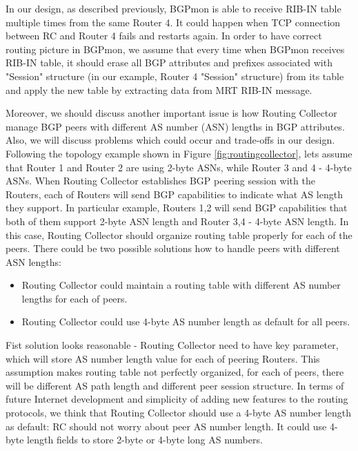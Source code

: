 In our design, as described previously, BGPmon is able to receive RIB-IN table multiple times from the same Router 4. It could happen when TCP connection between RC and Router 4 fails and restarts again.  In order to have correct routing picture in BGPmon, we assume that every time when BGPmon receives RIB-IN table, it should erase all BGP attributes and prefixes associated with "Session" structure (in our example, Router 4 "Session" structure) from its table and apply the new table by extracting data from MRT RIB-IN message. 

Moreover, we should discuss another important issue is how Routing Collector manage BGP peers with different AS number (ASN) lengths in BGP attributes\cite{bgprfc}. Also, we will discuss problems which could occur and trade-offs in our design. Following the topology example shown in Figure \ref{fig:routingcollector}, lets assume that Router 1 and Router 2 are using 2-byte ASNs, while Router 3 and 4 - 4-byte ASNs. When Routing Collector establishes BGP peering session with the Routers, each of Routers will send BGP capabilities to indicate what AS length they support. In particular example, Routers 1,2 will send BGP capabilities that both of them support 2-byte ASN length and Router 3,4 - 4-byte ASN length. In this case, Routing Collector should organize routing table properly for each of the peers. There could be two possible solutions how to handle peers with different ASN lengths:
\begin{itemize}
\item{Routing Collector could maintain a routing table with different AS number lengths for each of peers.}
\item{Routing Collector could use 4-byte AS number length as default for all peers.}
\end{itemize}

Fist solution looks reasonable - Routing Collector need to have key parameter, which will store AS number length value for each of peering Routers. This assumption makes routing table not perfectly organized, for each of peers, there will be different AS path length and different peer session structure. In terms of future Internet development and simplicity of adding new features to the routing protocols, we think that Routing Collector should use a 4-byte AS number length as default: RC should not worry about peer AS number length. It could use 4-byte length fields to store 2-byte or 4-byte long AS numbers. 

